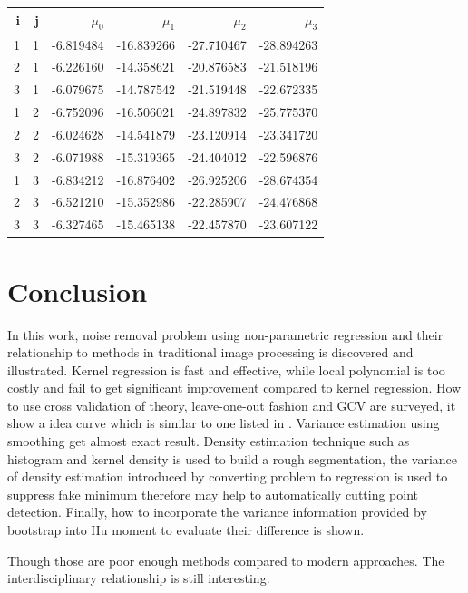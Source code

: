 \documentclass{article}
\begin{document}
\begin{tabular}{rrrrrr}
  \toprule
   i &  j &      $\mu_0$ &       $\mu_1$ &       $\mu_2$ &       $\mu_3$ \\
  \midrule
   1 &  1 & -6.819484 & -16.839266 & -27.710467 & -28.894263 \\
   2 &  1 & -6.226160 & -14.358621 & -20.876583 & -21.518196 \\
   3 &  1 & -6.079675 & -14.787542 & -21.519448 & -22.672335 \\
   1 &  2 & -6.752096 & -16.506021 & -24.897832 & -25.775370 \\
   2 &  2 & -6.024628 & -14.541879 & -23.120914 & -23.341720 \\
   3 &  2 & -6.071988 & -15.319365 & -24.404012 & -22.596876 \\
   1 &  3 & -6.834212 & -16.876402 & -26.925206 & -28.674354 \\
   2 &  3 & -6.521210 & -15.352986 & -22.285907 & -24.476868 \\
   3 &  3 & -6.327465 & -15.465138 & -22.457870 & -23.607122 \\
  \bottomrule
\end{tabular}

\section{Conclusion}

In this work, noise removal problem using non-parametric regression and their relationship to methods in traditional image processing 
is discovered and illustrated. Kernel regression is fast and effective, while local polynomial is too costly and fail to get significant
improvement compared to kernel regression. How to use cross validation of theory, leave-one-out fashion and GCV are surveyed, it show
a idea curve which is similar to one listed in \cite{wasserman2006all}. Variance estimation using smoothing get almost exact result. Density estimation
technique such as histogram and kernel density is used to build a rough segmentation, the variance of density estimation introduced by
converting problem to regression is used to suppress fake minimum therefore may help to automatically cutting point detection. Finally, 
how to incorporate the variance information provided by bootstrap into Hu moment to evaluate their difference is shown.

Though those are poor enough methods compared to modern approaches. The interdisciplinary relationship is still interesting. 
\end{document}
